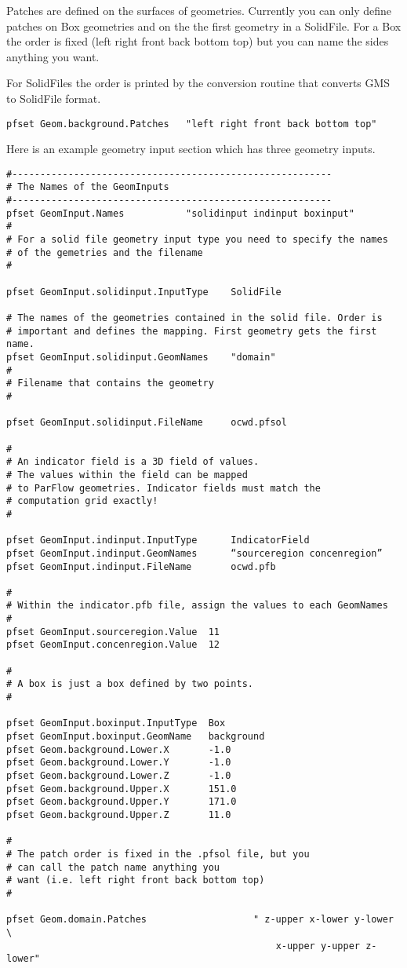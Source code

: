 {
Patches are defined on the surfaces of geometries.  Currently you can
only define patches on Box geometries and on the the first geometry in a
SolidFile.  For a Box the order is fixed (left right front back bottom
top) but you can name the sides anything you want.

For SolidFiles the order is printed by the conversion routine that
converts GMS to SolidFile format.
}
\begin{display}\begin{verbatim}
pfset Geom.background.Patches   "left right front back bottom top"
\end{verbatim}\end{display}

Here is an example geometry input section which has three geometry inputs.

\begin{display}\begin{verbatim}
#---------------------------------------------------------
# The Names of the GeomInputs
#---------------------------------------------------------
pfset GeomInput.Names 			"solidinput indinput boxinput"
#
# For a solid file geometry input type you need to specify the names
# of the gemetries and the filename
#

pfset GeomInput.solidinput.InputType	SolidFile

# The names of the geometries contained in the solid file. Order is
# important and defines the mapping. First geometry gets the first name.
pfset GeomInput.solidinput.GeomNames	"domain"
#
# Filename that contains the geometry
#

pfset GeomInput.solidinput.FileName 	ocwd.pfsol

#
# An indicator field is a 3D field of values.
# The values within the field can be mapped
# to ParFlow geometries. Indicator fields must match the
# computation grid exactly!
#

pfset GeomInput.indinput.InputType 		IndicatorField
pfset GeomInput.indinput.GeomNames    	“sourceregion concenregion”
pfset GeomInput.indinput.FileName		ocwd.pfb

#
# Within the indicator.pfb file, assign the values to each GeomNames
#
pfset GeomInput.sourceregion.Value 	11
pfset GeomInput.concenregion.Value 	12

#
# A box is just a box defined by two points.
#

pfset GeomInput.boxinput.InputType	Box
pfset GeomInput.boxinput.GeomName	background
pfset Geom.background.Lower.X 		-1.0
pfset Geom.background.Lower.Y 		-1.0
pfset Geom.background.Lower.Z 		-1.0
pfset Geom.background.Upper.X 		151.0
pfset Geom.background.Upper.Y 		171.0
pfset Geom.background.Upper.Z 		11.0

#
# The patch order is fixed in the .pfsol file, but you
# can call the patch name anything you
# want (i.e. left right front back bottom top)
#

pfset Geom.domain.Patches             		" z-upper x-lower y-lower \
                                      			x-upper y-upper z-lower"

\end{verbatim}\end{display}


